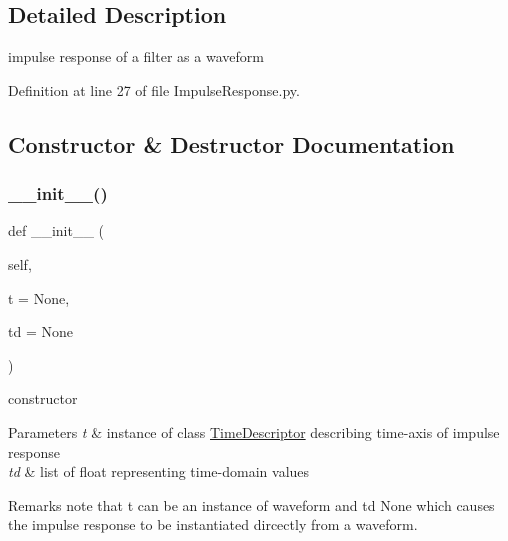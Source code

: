 \subsection{Detailed Description}
impulse response of a filter as a waveform 

Definition at line 27 of file Impulse\+Response.\+py.



\subsection{Constructor \& Destructor Documentation}
\mbox{\label{classSignalIntegrity_1_1TimeDomain_1_1Waveform_1_1ImpulseResponse_1_1ImpulseResponse_ade7e2b05916c8bb56f58333b3fca239d}} 
\subsubsection{\texorpdfstring{\+\_\+\+\_\+init\+\_\+\+\_\+()}{\_\_init\_\_()}}
{\footnotesize\ttfamily def \+\_\+\+\_\+init\+\_\+\+\_\+ (\begin{DoxyParamCaption}\item[{}]{self,  }\item[{}]{t = {\ttfamily None},  }\item[{}]{td = {\ttfamily None} }\end{DoxyParamCaption})}



constructor 


\begin{DoxyParams}{Parameters}
{\em t} & instance of class \hyperlink{namespaceSignalIntegrity_1_1TimeDomain_1_1Waveform_1_1TimeDescriptor}{Time\+Descriptor} describing time-\/axis of impulse response \\
\hline
{\em td} & list of float representing time-\/domain values \\
\hline
\end{DoxyParams}
\begin{DoxyRemark}{Remarks}
note that t can be an instance of waveform and td None which causes the impulse response to be instantiated dircectly from a waveform. 
\end{DoxyRemark}


